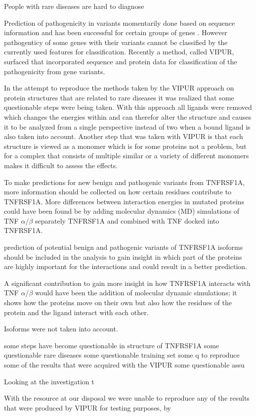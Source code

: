 
People with rare diseases are hard to diagnose

Prediction of pathogenicity in variants momentarily done based on sequence information and has been successful for certain groups of genes \cite{}.
However pathogenticy of some genes with their variants cannot be classified by the currently used features for classification. Recently a method, called VIPUR, surfaced that incorporated sequence and protein data for classification of the pathogenicity from gene variants\cite{}. 

In the attempt to reproduce the methods taken by the VIPUR approach on protein structures that are related to rare diseases it was realized that some questionable steps were being taken. With this approach all ligands were removed \cite{} which changes the energies within and can therefor alter the structure \cite{} and causes it to be analyzed from a single perspective instead of two when a bound ligand is also taken into account. 
Another step that was taken with VIPUR is that each structure is viewed as a monomer which is for some proteins not a problem, but for a complex that consists of multiple similar or a variety of different monomers makes it difficult to assess the effects.

To make predictions for new benign and pathogenic variants from TNFRSF1A, more information should be collected on how certain residues contribute to TNFRSF1A. More differences between interaction energies in mutated proteins could have been found be by adding molecular dynamics (MD) simulations of TNF $\alpha$/$\beta$ separately TNFRSF1A and combined with TNF docked into TNFRSF1A.



 prediction of potential benign and pathogenic variants of TNFRSF1A isoforms should be included in the analysis to gain insight in which part of the proteins are highly important for the interactions and could result in a better prediction.

 A significant contribution to gain more insight in how TNFRSF1A interacts with TNF $\alpha$/$\beta$ would have been the addition of molecular dynamic simulations; it shows how the proteins move on their own but also how the residues of the protein and the ligand interact with each other.



Isoforms were not taken into account.



 some steps have become questionable in structure of TNFRSF1A some questionable  rare diseases  some questionable  training set some q to reproduce some of the results that were acquired with the VIPUR some questionable assu


Looking at the investigation t

With the resource at our disposal we were unable to reproduce any of the results that were produced by VIPUR for testing purposes, by 